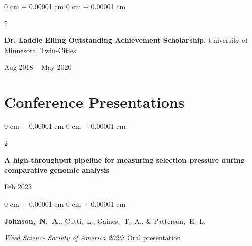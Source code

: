 \documentclass[10pt, letterpaper]{article}
\newenvironment{onecolentry}{
    \begin{adjustwidth}{
        0 cm + 0.00001 cm
    }{
        0 cm + 0.00001 cm
    }
}{
    \end{adjustwidth}
} %
\newenvironment{twocolentry}[2][]{
    \onecolentry
    \def\secondColumn{#2}
    \setcolumnwidth{\fill, 4.5 cm}
    \begin{paracol}{2}
}{
    \switchcolumn \raggedleft \secondColumn
    \end{paracol}
    \endonecolentry
} %
\begin{document}
        \vspace{0.2 cm}


        \begin{samepage} 
            \begin{twocolentry}{
                Aug 2018 – May 2020
                }
                \textbf{Dr. Laddie Elling Outstanding Achievement Scholarship}, University of Minnesota, Twin-Cities
            \end{twocolentry}
        \end{samepage}  
        

        

    \section{Conference Presentations}




        \begin{samepage}
            \begin{twocolentry}{
                Feb 2025
                }
                \textbf{A high-throughput pipeline for measuring selection pressure during comparative genomic analysis}
            \end{twocolentry}

            \vspace{0.10 cm}
            
            \begin{onecolentry}
                \mbox{\textbf{Johnson, N. A.}}, \mbox{Cutti, L.}, \mbox{Gaines, T. A.}, \& \mbox{Patterson, E. L.}

                \vspace{0.10 cm}
                
                \textit{Weed Science Society of America 2025}: Oral presentation
            \end{onecolentry}
        \end{samepage}


        \vspace{0.2 cm}
\end{document}

